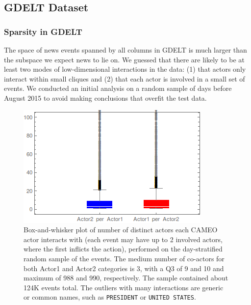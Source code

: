 
\subsection{GDELT Dataset}

\subsubsection{Sparsity in GDELT}

The space of news events spanned by all columns in GDELT is much larger than the subspace we expect news to lie on. We guessed that there are likely to be at least two modes of low-dimensional interactions in the data: (1) that actors only interact within small cliques and (2) that each actor is involved in a small set of events. We conducted an initial analysis on a random sample of days before August 2015 to avoid making conclusions that overfit the test data.

\begin{figure}[ht]
\vskip 0.2in
\begin{center}
\centerline{\includegraphics[width=\columnwidth]{images/actors-per-actor.png}}
\caption{Box-and-whisker plot of number of distinct actors each CAMEO actor interacts with (each event may have up to 2 involved actors, where the first inflicts the action), performed on the day-stratified random sample of the events. The medium number of co-actors for both Actor1 and Actor2 categories is 3, with a Q3 of 9 and 10 and maximum of 988 and 990, respectively. The sample contained about 124K events total. The outliers with many interactions are generic or common names, such as \texttt{PRESIDENT} or \texttt{UNITED STATES}.
}
\end{center}
\vskip -0.2in
\label{fig:actors-per-actor}
\end{figure} 

